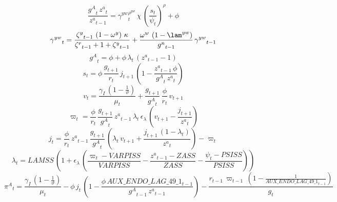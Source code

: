 \begin{dmath}
\frac{{{g^A}}_{t}\, {{z^a}}_{t}}{{{z^a}}_{t-1}}={{\gamma^{yw}}}_{t}^{{{\rho^{yw}}}}\, {{\chi}}\, \left(\frac{{{s}}_{t}}{{{\psi}}_{t}}\right)^{{{\rho}}}+{{\phi}}
\end{dmath}
\begin{dmath}
{{\gamma^{yw}}}_{t}=\frac{{{\zeta^{y}}}_{t-1}\, \left(1-{{\omega^{y}}}\right)\, {{\kappa}}}{{{\zeta^{r}}}_{t-1}+1+{{\zeta^{y}}}_{t-1}}+\frac{{{\omega^w}}\, \left(1-{{\lam^{yw}}}\right)}{{{g^n}}_{t-1}}\, {{\gamma^{yw}}}_{t-1}
\end{dmath}
\begin{dmath}
{{g^A}}_{t}={{\phi}}+{{\phi}}\, {{\lambda}}_{t}\, \left({{z^a}}_{t-1}-1\right)
\end{dmath}
\begin{dmath}
{{s}}_{t}={{\phi}}\, \frac{{{g}}_{t+1}}{{{r}}_{t}}\, {{j}}_{t+1}\, \left(1-\frac{{{z^a}}_{t-1}\, {{\phi}}}{{{g^A}}_{t}\, {{z^a}}_{t}}\right)
\end{dmath}
\begin{dmath}
{{v}}_{t}=\frac{{{\gamma_I}}\, \left(1-\frac{1}{{{\vartheta}}}\right)}{{{\mu}}_{t}}+\frac{{{g}}_{t+1}}{{{g^A}}_{t}}\, \frac{{{\phi}}}{{{r}}_{t}}\, {{v}}_{t+1}
\end{dmath}
\begin{dmath}
{{\varpi}}_{t}=\frac{{{\phi}}}{{{r}}_{t}}\, \frac{{{g}}_{t+1}}{{{g^A}}_{t}}\, {{z^a}}_{t-1}\, {{\lambda}}_{t}\, {{\epsilon_{\lambda}}}\, \left({{v}}_{t+1}-\frac{{{j}}_{t+1}}{{{z^a}}_{t}}\right)
\end{dmath}
\begin{dmath}
{{j}}_{t}=\frac{{{\phi}}}{{{r}}_{t}}\, {{z^a}}_{t-1}\, \frac{{{g}}_{t+1}}{{{g^A}}_{t}}\, \left({{\lambda}}_{t}\, {{v}}_{t+1}+\frac{{{j}}_{t+1}\, \left(1-{{\lambda}}_{t}\right)}{{{z^a}}_{t}}\right)-{{\varpi}}_{t}
\end{dmath}
\begin{dmath}
{{\lambda}}_{t}={{LAMSS}}\, \left(1+{{\epsilon_{\lambda}}}\, \left(\frac{{{\varpi}}_{t}-{{VARPISS}}}{{{VARPISS}}}-\frac{{{z^a}}_{t-1}-{{ZASS}}}{{{ZASS}}}-\frac{{{\psi}}_{t}-{{PSISS}}}{{{PSISS}}}\right)\right)
\end{dmath}
\begin{dmath}
{{\pi^{A}}}_{t}=\frac{{{\gamma_I}}\, \left(1-\frac{1}{{{\vartheta}}}\right)}{{{\mu}}_{t}}-{{\phi}}\, {{j}}_{t}\, \left(1-\frac{{{\phi}}\, {AUX\_ENDO\_LAG\_49\_1}_{t-1}}{{{g^A}}_{t-1}\, {{z^a}}_{t-1}}\right)-\frac{{{r}}_{t-1}\, {{\varpi}}_{t-1}\, \left(1-\frac{1}{{AUX\_ENDO\_LAG\_49\_1}_{t-1}}\right)}{{{g}}_{t}}
\end{dmath}
